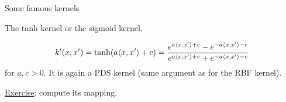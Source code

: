 \documentclass[xcolor={usenames,dvipsnames}]{beamer}
\begin{document}
%
%
% 
% 
% 
% 
% 


\begin{frame}{Some famous kernels}



\begin{exampleblock}{The tanh kernel or the sigmoid kernel.} 

  \begin{equation*}
    k'(x, x') = \tanh(a \langle x, x' \rangle + c) = \frac{e^{a \langle x, x' \rangle + c} - e^{-a \langle x, x' \rangle - c}}{e^{a \langle x, x' \rangle + c} + e^{-a \langle x, x' \rangle - c}}
  \end{equation*}
  for $a, c > 0$. It is again a PDS kernel (same argument as for the RBF kernel).
  \end{exampleblock}

 \pause 
  
 \underline{Exercise}: compute its mapping.
\end{frame} 
 
\end{document}
